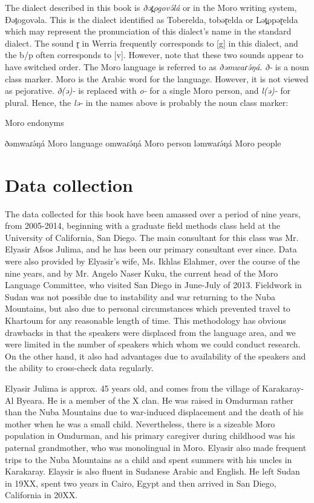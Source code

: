 The dialect described in this book is \textit{ðət̪ogovə́lá} or in the Moro writing system, Đət̠ogovəla. This is the dialect identified as Toberelda, tobəɽelda or Lət̪opəɽelda which may represent the pronunciation of this dialect’s name in the standard dialect. The sound ɽ in Werria frequently corresponds to [g] in this dialect, and the b/p often corresponds to [v]. However, note that these two sounds appear to have switched order. The Moro language is referred to as \textit{ðəmwaɾə́ŋá}. \textit{ð-} is a noun class marker. Moro is the Arabic word for the language. However, it is not viewed as pejorative. \textit{ð(ə)-} is replaced with \textit{o-} for a single Moro person, and \textit{l(ə)-} for plural. Hence, the \textit{lə-} in the names above is probably the noun class marker:

\begin{exe}
\ex Moro endonyms
	\begin{xlist}
		\ex	ðəmwaɾə́ŋá	Moro language
		\ex omwaɾə́ŋá	Moro person
		\ex ləmwaɾə́ŋá	Moro people
	\end{xlist}
\end{exe}

	
\section{Data collection}
The data collected for this book have been amassed over a period of nine years, from 2005-2014, beginning with a graduate field methods class held at the University of California, San Diego. The main consultant for this class was Mr. Elyasir Afsos Julima, and he has been our primary consultant ever since. Data were also provided by Elyasir’s wife, Ms. Ikhlas Elahmer, over the course of the nine years, and by Mr. Angelo Naser Kuku, the current head of the Moro Language Committee, who visited San Diego in June-July of 2013. Fieldwork in Sudan was not possible due to instability and war returning to the Nuba Mountains, but also due to personal circumstances which prevented travel to Khartoum for any reasonable length of time. This methodology has obvious drawbacks in that the speakers were displaced from the language area, and we were limited in the number of speakers which whom we could conduct research. On the other hand, it also had advantages due to availability of the speakers and the ability to cross-check data regularly. 

Elyasir Julima is approx. 45 years old, and comes from the village of Karakaray-Al Byeara. He is a member of the X clan. He was raised in Omdurman rather than the Nuba Mountains due to war-induced displacement and the death of his mother when he was a small child. Nevertheless, there is a sizeable Moro population in Omdurman, and his primary caregiver during childhood was his paternal grandmother, who was monolingual in Moro. Elyasir also made frequent trips to the Nuba Mountains as a child and spent summers with his uncles in Karakaray. Elaysir is also fluent in Sudanese Arabic and English. He left Sudan in 19XX, spent two years in Cairo, Egypt and then arrived in San Diego, California in 20XX. 

